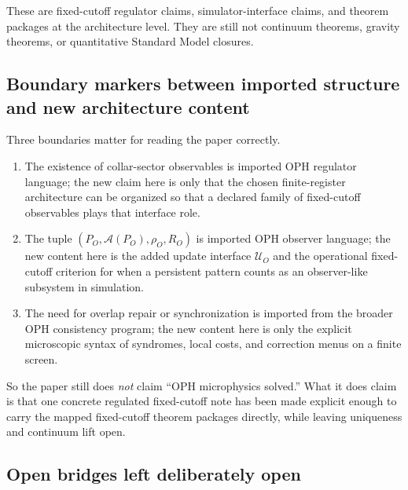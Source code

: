 \documentclass[11pt]{article}
\begin{document}
These are fixed-cutoff regulator claims, simulator-interface claims, and theorem packages at the
architecture level. They are still not continuum
theorems, gravity theorems, or quantitative Standard Model closures.

\subsection{Boundary markers between imported structure and new architecture content}

Three boundaries matter for reading the paper correctly.
\begin{enumerate}[leftmargin=2em]
\item The existence of collar-sector observables is imported OPH regulator language; the new
claim here is only that the chosen finite-register architecture can be organized so that a
declared family of fixed-cutoff observables plays that interface role.
\item The tuple $(P_O,\mathcal A(P_O),\rho_O,R_O)$ is imported OPH observer language; the new
content here is the added update interface $\mathcal U_O$ and the operational fixed-cutoff criterion
for when a persistent pattern counts as an observer-like subsystem in simulation.
\item The need for overlap repair or synchronization is imported from the broader OPH consistency
program; the new content here is only the explicit microscopic syntax of syndromes, local costs,
and correction menus on a finite screen.
\end{enumerate}

So the paper still does \emph{not} claim ``OPH microphysics solved.'' What it does claim is that
one concrete regulated fixed-cutoff note has been made explicit enough to carry the mapped
fixed-cutoff theorem packages directly, while leaving uniqueness and continuum lift open.

\subsection{Open bridges left deliberately open}
\end{document}
